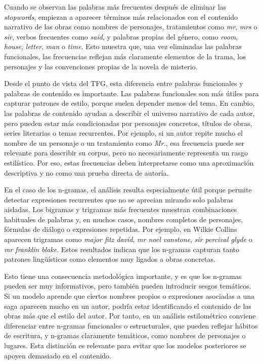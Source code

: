 \documentclass[IB]{TFUOC}%
\begin{document}
Cuando se observan las palabras más frecuentes después de eliminar las \textit{stopwords}, empiezan a aparecer términos más relacionados con el contenido narrativo de las obras como nombres de personajes, tratamientos como \textit{mr}, \textit{mrs} o \textit{sir}, verbos frecuentes como \textit{said}, y palabras propias del género, como \textit{room}, \textit{house}, \textit{letter}, \textit{man} o \textit{time}. Esto muestra que, una vez eliminadas las palabras funcionales, las frecuencias reflejan más claramente elementos de la trama, los personajes y las convenciones propias de la novela de misterio.

Desde el punto de vista del TFG, esta diferencia entre palabras funcionales y palabras de contenido es importante. Las palabras funcionales son más útiles para capturar patrones de estilo, porque suelen depender menos del tema. En cambio, las palabras de contenido ayudan a describir el universo narrativo de cada autor, pero pueden estar más condicionadas por personajes concretos, títulos de obras, series literarias o temas recurrentes. Por ejemplo, si un autor repite mucho el nombre de un personaje o un tratamiento como \textit{Mr.}, esa frecuencia puede ser relevante para describir su corpus, pero no necesariamente representa un rasgo estilístico. Por eso, estas frecuencias deben interpretarse como una aproximación descriptiva y no como una prueba directa de autoría.

En el caso de los n-gramas, el análisis resulta especialmente útil porque permite detectar expresiones recurrentes que no se aprecian mirando solo palabras aisladas. Los bigramas y trigramas más frecuentes muestran combinaciones habituales de palabras y, en muchos casos, nombres completos de personajes, fórmulas de diálogo o expresiones repetidas. Por ejemplo, en Wilkie Collins aparecen trigramas como \textit{major fitz david}, \textit{mr noel vanstone}, \textit{sir percival glyde} o \textit{mr franklin blake}. Estos resultados indican que los n-gramas capturan tanto patrones lingüísticos como elementos muy ligados a obras concretas.

Esto tiene una consecuencia metodológica importante, y es que los n-gramas pueden ser muy informativos, pero también pueden introducir sesgos temáticos. Si un modelo aprende que ciertos nombres propios o expresiones asociadas a una saga aparecen mucho en un autor, podría estar identificando el contenido de las obras más que el estilo del autor. Por tanto, en un análisis estilométrico conviene diferenciar entre n-gramas funcionales o estructurales, que pueden reflejar hábitos de escritura, y n-gramas claramente temáticos, como nombres de personajes o lugares. Esta distinción es relevante para evitar que los modelos posteriores se apoyen demasiado en el contenido.
\end{document}

